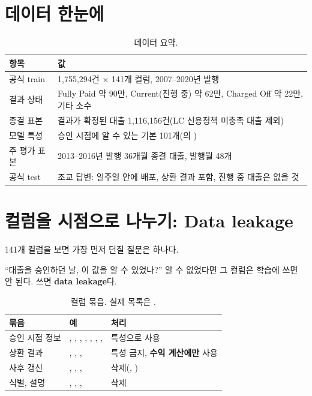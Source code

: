\section{데이터 한눈에}
\begin{table}[H]\centering\small
\begin{tabularx}{\linewidth}{@{}lL@{}}\toprule
항목 & 값\\\midrule
공식 train & 1,755,294건 \ensuremath{\times} 141개 컬럼, 2007--2020년 발행\\
결과 상태 & Fully Paid 약 90만, Current(진행 중) 약 62만, Charged Off 약 22만, 기타 소수\\
종결 표본 & 결과가 확정된 대출 1,116,156건(LC 신용정책 미충족 대출 제외)\\
모델 특성 & 승인 시점에 알 수 있는 기본 101개(의 )\\
주 평가 표본 & 2013--2016년 발행 36개월 종결 대출, 발행월 48개\\
공식 test & 조교 답변: 일주일 안에 배포, 상환 결과 포함, 진행 중 대출은 없을 것\\\bottomrule
\end{tabularx}
\caption{데이터 요약.}
\end{table}

\section{컬럼을 시점으로 나누기: Data leakage}
141개 컬럼을 보면 가장 먼저 던질 질문은 하나다.

\begin{keybox}[누수 판별 질문]
``대출을 승인하던 날, 이 값을 알 수 있었나?''
알 수 없었다면 그 컬럼은 학습에 쓰면 안 된다. 쓰면 \textbf{data leakage}다.
\end{keybox}

\begin{table}[H]\centering\small
\begin{tabularx}{\linewidth}{@{}p{33mm}LL@{}}\toprule
묶음 & 예 & 처리\\\midrule
승인 시점 정보 & , , , , , , ,  & 특성으로 사용\\
상환 결과 & , , ,  & 특성 금지, \textbf{수익 계산에만} 사용\\
사후 갱신 & , , ,  & 삭제(, )\\
식별, 설명 & , , ,  & 삭제\\\bottomrule
\end{tabularx}
\caption{컬럼 묶음. 실제 목록은 .}
\end{table}

